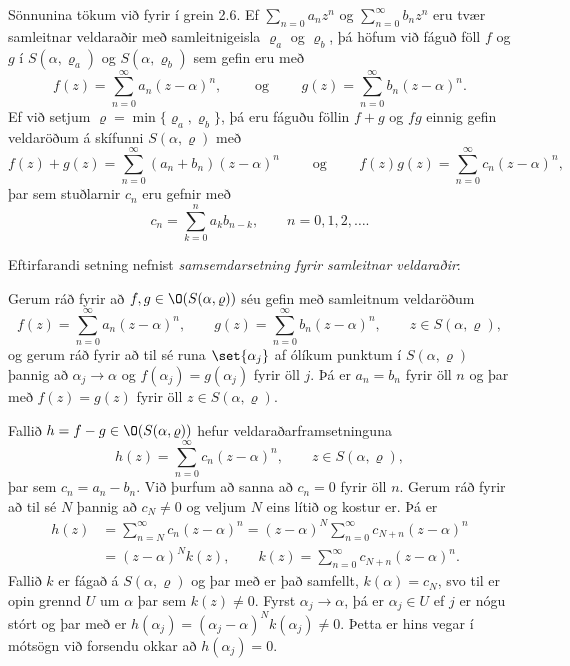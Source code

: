 Sönnunina tökum við fyrir í grein  2.6.  Ef $\sum_{n=0}a_nz^n$ og
$\sum_{n=0}^\infty b_nz^n$ eru tvær samleitnar veldaraðir með
samleitnigeisla $\varrho_a$ og $\varrho_b$, þá höfum við fáguð föll
$f$ og $g$ í $S(\alpha,\varrho_a)$ og $S(\alpha,\varrho_b)$ sem gefin
eru með 
$$
f(z)=\sum_{n=0}^\infty a_n(z-\alpha)^n, \qquad \text{ og } \qquad
g(z)=\sum_{n=0}^\infty b_n(z-\alpha)^n.
$$
Ef við setjum $\varrho=\min\{\varrho_a,\varrho_b\}$, þá eru fáguðu
föllin $f+g$ og $fg$ einnig gefin veldaröðum á skífunni
$S(\alpha,\varrho)$ með
$$
f(z)+g(z)=\sum_{n=0}^\infty (a_n+b_n)(z-\alpha)^n 
\qquad \text{ og } \qquad f(z)g(z)=\sum_{n=0}^\infty c_n(z-\alpha)^n,
$$
þar sem stuðlarnir $c_n$ eru gefnir með
$$
c_n=\sum_{k=0}^n a_kb_{n-k}, \qquad n=0,1,2,\dots. 
$$

Eftirfarandi setning nefnist {\it
samsemdarsetning fyrir samleitnar
veldaraðir}: 

\begin{se}
Gerum ráð fyrir að $f,g\in \O(S(\alpha,\varrho))$ séu gefin með
samleitnum veldaröðum
 $$f(z)=\sum\limits_{n=0}^\infty a_n(z-\alpha)^n, \qquad
g(z)=\sum\limits_{n=0}^\infty b_n(z-\alpha)^n, \qquad
z\in S(\alpha,\varrho),
 $$
og gerum ráð fyrir að til sé runa $\set{\alpha_j}$ af ólíkum punktum
í $S(\alpha,\varrho)$ þannig að $\alpha_j\to \alpha$ og
$f(\alpha_j)=g(\alpha_j)$ fyrir öll $j$.  Þá er $a_n=b_n$ fyrir öll
$n$ og þar með $f(z)=g(z)$ fyrir öll $z\in S(\alpha,\varrho)$.
\end{se} 
 
\begin{so}
Fallið $h=f-g\in \O(S(\alpha,\varrho))$ hefur
veldaraðar\-fram\-setninguna
 $$h(z)=\sum\limits_{n=0}^\infty c_n(z-\alpha)^n, \qquad z\in
S(\alpha,\varrho), 
 $$
þar sem $c_n=a_n-b_n$.  Við þurfum að sanna að $c_n=0$ fyrir öll $n$.
  Gerum ráð fyrir að til sé $N$ þannig að $c_N\neq 0$ og veljum $N$
eins lítið og kostur er.  Þá er 
\begin{align*}
h(z)&= \sum\limits_{n=N}^\infty c_n(z-\alpha)^n = 
(z-\alpha)^N\sum\limits_{n=0}^\infty c_{N+n}(z-\alpha)^n\\
&= (z-\alpha)^N k(z), \qquad 
k(z) = \sum\limits_{n=0}^\infty c_{N+n}(z-\alpha)^n.
\end{align*}
Fallið $k$ er fágað á $S(\alpha,\varrho)$ og þar með er það samfellt,
$k(\alpha)=c_{N}$, svo til er opin grennd $U$ um $\alpha$ þar sem
$k(z)\neq 0$.  Fyrst $\alpha_j\to \alpha$, þá er $\alpha_j\in U$ ef
$j$ er nógu stórt og þar með er
$h(\alpha_j)=(\alpha_j-\alpha)^Nk(\alpha_j)\neq 0$.  Þetta er hins
vegar í mótsögn við forsendu okkar að $h(\alpha_j)=0$.  
\end{so}


